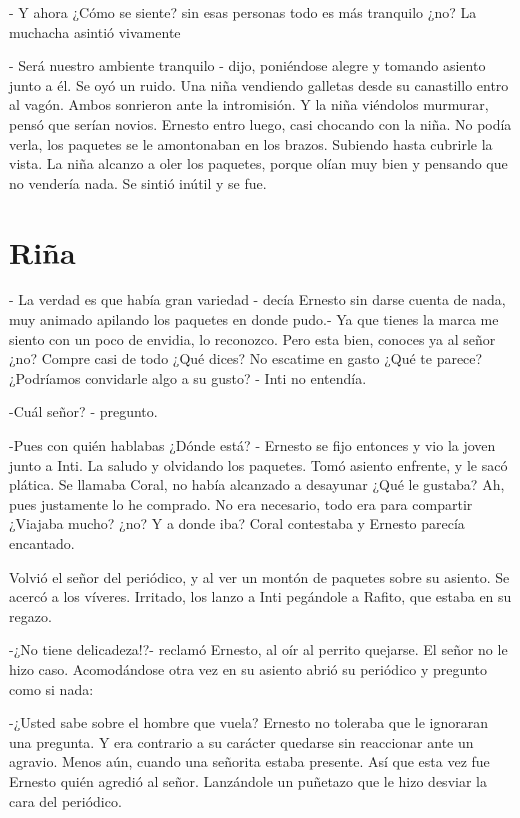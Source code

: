 - Y ahora ¿Cómo se siente? sin esas personas todo es más tranquilo ¿no? La muchacha asintió vivamente

- Será nuestro ambiente tranquilo - dijo, poniéndose alegre y tomando asiento junto a él.
Se oyó un ruido. Una niña vendiendo galletas desde su canastillo entro al vagón. Ambos sonrieron ante la intromisión. Y la niña viéndolos murmurar, pensó que serían novios. Ernesto entro luego, casi chocando con la niña. No podía verla, los paquetes se le amontonaban en los brazos. Subiendo hasta cubrirle la vista. La niña alcanzo a oler los paquetes, porque olían muy bien y pensando que no vendería nada. Se sintió inútil y se fue.



\chapter{Riña}
- La verdad es que había gran variedad - decía Ernesto sin darse cuenta de nada, muy animado apilando los paquetes en donde pudo.- Ya que tienes la marca me siento con un poco de envidia, lo reconozco. Pero esta bien, conoces ya al señor ¿no? Compre casi de todo ¿Qué dices? No escatime en gasto ¿Qué te parece? ¿Podríamos convidarle algo a su gusto? - Inti no entendía.

-Cuál señor? - pregunto.

-Pues con quién hablabas ¿Dónde está? - Ernesto se fijo entonces y vio la joven junto a Inti. La saludo y olvidando los paquetes. Tomó asiento enfrente, y le sacó plática. Se llamaba Coral, no había alcanzado a desayunar ¿Qué le gustaba? Ah, pues justamente lo he comprado. No era necesario, todo era para compartir ¿Viajaba mucho? ¿no? Y a donde iba? Coral contestaba y Ernesto parecía encantado.

Volvió el señor del periódico, y al ver un montón de paquetes sobre su asiento. Se acercó a los víveres. Irritado, los lanzo a Inti pegándole a Rafito, que estaba en su regazo.

-¿No tiene delicadeza!?- reclamó Ernesto, al oír al perrito quejarse. El señor no le hizo caso. Acomodándose otra vez en su asiento abrió su periódico y pregunto como si nada:

-¿Usted sabe sobre el hombre que vuela? Ernesto no toleraba que le ignoraran una pregunta. Y era contrario a su carácter quedarse sin reaccionar ante un agravio. Menos aún, cuando una señorita estaba presente. Así que esta vez fue Ernesto quién agredió al señor. Lanzándole un puñetazo que le hizo desviar la cara del periódico.

